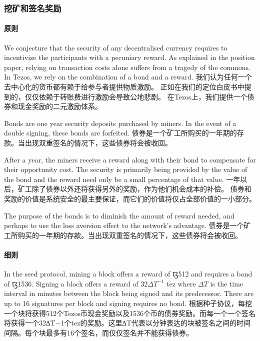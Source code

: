 \documentclass[letterpaper]{article}
\newcommand{\tz}{{\fontspec{DejaVu Sans} \small{ꜩ}}}
\begin{document}
\subsubsection{挖矿和签名奖励}

\paragraph{原则}
We conjecture that the security of any decentralised currency requires
to incentivize the participants with a pecuniary reward. As explained in the
position paper, relying on transaction costs alone suffers from a tragedy of the
commons. In Tezos, we rely on the combination of a bond and a reward.
我们认为任何一个去中心化的货币都有赖于给参与者提供物质激励。
正如在我们的定位白皮书中提到的，仅仅依赖于转账费进行激励会导致公地悲剧。
在Tezos上，我们提供一个债券和现金奖励的二元激励体系。

Bonds are one year security deposits purchased by miners.
In the event of a double signing, these bonds are forfeited.
债券是一个矿工所购买的一年期的存款。当出现双重签名的情况下，这些债券将会被收回。

After a year, the miners  receive a reward along with their bond to compensate
for their opportunity cost. The security is primarily being provided by the
value of the bond and the reward need only be a small percentage of that value.
一年以后，矿工除了债券以外还将获得另外的奖励，作为他们机会成本的补偿。
债券和奖励的价值是系统安全的最主要保证，而它们的价值将仅占全部价值的一小部分。

The purpose of the bonds is to diminish the amount of reward needed, and perhaps
to use the loss aversion effect to the network's advantage.
债券是一个矿工所购买的一年期的存款。当出现双重签名的情况下，这些债券将会被收回。

\paragraph{细则}
In the seed protocol, mining a block offers a reward of \tz\num{512} and
requires a bond of \tz\num{1536}. Signing a block offers a reward of
$32\Delta T^{-1}$ tez where $\Delta T$ is the time interval in minutes between
the block being signed and its predecessor. There are up to 16 signatures per block
and signing requires no bond.
根据种子协议，每挖一个块将获得512个Tezos币现金奖励以及1536个币的债券奖励。而每一个一个签名将获得一个32∆T−1个tez的奖励。这里∆T代表以分钟表达的块被签名之间的时间间隔。每个块最多有16个签名，而仅仅签名并不能获得债券。
\end{document}
